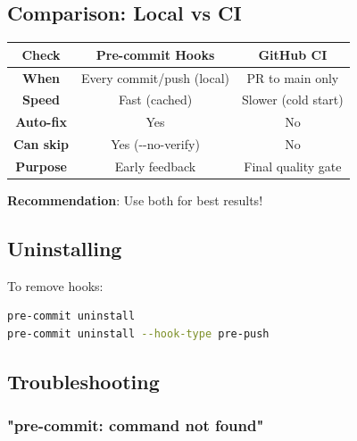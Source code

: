 \subsection{Comparison: Local vs CI}\label{cr:app:archive-quickstart-precommit:comparison-local-vs-ci}

\begin{record}

{
\begin{longtable}[]{@{}ccc@{}}
\toprule\noalign{}
Check & Pre-commit Hooks & GitHub CI \\
\midrule\noalign{}
\endhead
\bottomrule\noalign{}
\endlastfoot
\textbf{When} & Every commit/\allowbreak{}push (local) & PR to main
only \\
\textbf{Speed} & Fast (cached) & Slower (cold start) \\
\textbf{Auto-fix} & Yes & No \\
\textbf{Can skip} & Yes (-\/-no-verify) & No \\
\textbf{Purpose} & Early feedback & Final quality gate \\
\end{longtable}
}

\textbf{Recommendation}: Use both for best results!

\end{record}

\subsection{Uninstalling}\label{cr:app:archive-quickstart-precommit:uninstalling}

\begin{record}

To remove hooks:

\begin{lstlisting}[language=bash]
pre-commit uninstall
pre-commit uninstall --hook-type pre-push
\end{lstlisting}

\end{record}

\subsection{Troubleshooting}\label{cr:app:archive-quickstart-precommit:troubleshooting}

\subsubsection{"pre-commit: command not found"}\label{cr:app:archive-quickstart-precommit:pre-commit-command-not-found}

